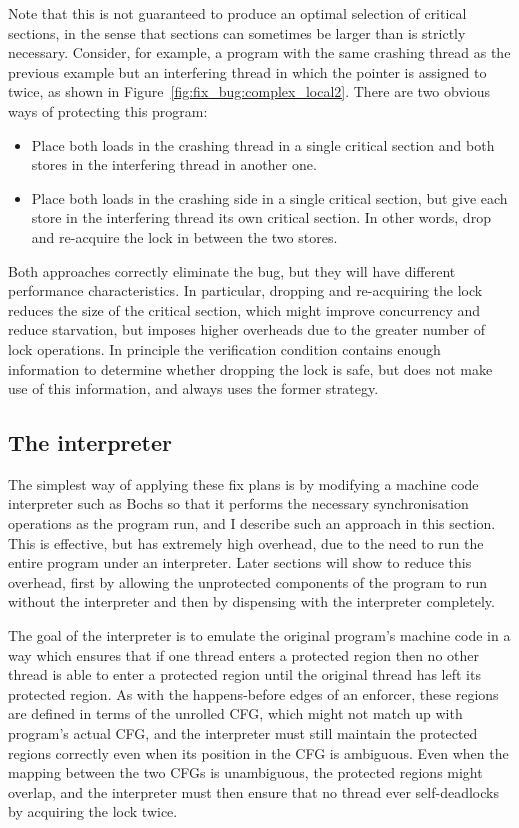 Note that this is not guaranteed to produce an optimal selection of
critical sections, in the sense that sections can sometimes be larger
than is strictly necessary.  Consider, for example, a program with the
same crashing thread as the previous example but an interfering thread
in which the pointer is assigned to twice, as shown in
Figure~\ref{fig:fix_bug:complex_local2}.  There are two obvious
ways of protecting this program:

\begin{itemize}
\item
  Place both loads in the crashing thread in a single critical section and
  both stores in the interfering thread in another one.
\item
  Place both loads in the crashing side in a single critical section,
  but give each store in the interfering thread its own critical
  section.  In other words, drop and re-acquire the lock in between
  the two stores.
\end{itemize}

Both approaches correctly eliminate the bug, but they will have
different performance characteristics.  In particular, dropping and
re-acquiring the lock reduces the size of the critical section, which
might improve concurrency and reduce starvation, but imposes higher
overheads due to the greater number of lock operations.  In principle
the verification condition contains enough information to determine
whether dropping the lock is safe, but {\technique} does not make use
of this information, and always uses the former strategy.

\subsection{The interpreter}

The simplest way of applying these fix plans is by modifying a machine
code interpreter such as Bochs\needCite{} so that it performs the
necessary synchronisation operations as the program run, and I
describe such an approach in this section.  This is effective, but has
extremely high overhead, due to the need to run the entire program
under an interpreter.  Later sections will show to reduce this
overhead, first by allowing the unprotected components of the program
to run without the interpreter and then by dispensing with the
interpreter completely.

 The goal of the interpreter is to emulate the original
program's machine code in a way which ensures that if one thread
enters a protected region then no other thread is able to enter a
protected region until the original thread has left its protected
region.  As with the happens-before edges of an
enforcer, these regions are defined in terms of the
unrolled CFG, which might not match up with program's actual CFG, and
the interpreter must still maintain the protected regions correctly
even when its position in the CFG is ambiguous.  Even when the mapping
between the two CFGs is unambiguous, the protected regions might
overlap, and the interpreter must then ensure that no thread ever
self-deadlocks by acquiring the lock twice.

